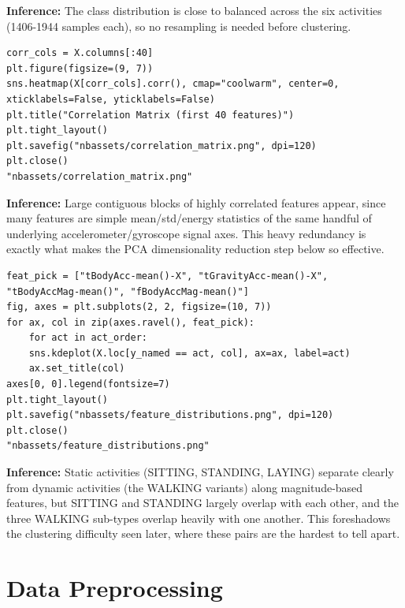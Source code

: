 \documentclass[12pt,a4paper]{article}
\begin{document}
\url{}

\textbf{Inference:} The class distribution is close to balanced across the six
activities (1406-1944 samples each), so no resampling is needed before
clustering.

\begin{verbatim}
corr_cols = X.columns[:40]
plt.figure(figsize=(9, 7))
sns.heatmap(X[corr_cols].corr(), cmap="coolwarm", center=0, xticklabels=False, yticklabels=False)
plt.title("Correlation Matrix (first 40 features)")
plt.tight_layout()
plt.savefig("nbassets/correlation_matrix.png", dpi=120)
plt.close()
"nbassets/correlation_matrix.png"
\end{verbatim}

\url{}

\textbf{Inference:} Large contiguous blocks of highly correlated features appear,
since many features are simple mean/std/energy statistics of the same
handful of underlying accelerometer/gyroscope signal axes. This heavy
redundancy is exactly what makes the PCA dimensionality reduction step
below so effective.

\begin{verbatim}
feat_pick = ["tBodyAcc-mean()-X", "tGravityAcc-mean()-X", "tBodyAccMag-mean()", "fBodyAccMag-mean()"]
fig, axes = plt.subplots(2, 2, figsize=(10, 7))
for ax, col in zip(axes.ravel(), feat_pick):
    for act in act_order:
	sns.kdeplot(X.loc[y_named == act, col], ax=ax, label=act)
    ax.set_title(col)
axes[0, 0].legend(fontsize=7)
plt.tight_layout()
plt.savefig("nbassets/feature_distributions.png", dpi=120)
plt.close()
"nbassets/feature_distributions.png"
\end{verbatim}

\url{}

\textbf{Inference:} Static activities (SITTING, STANDING, LAYING) separate clearly
from dynamic activities (the WALKING variants) along magnitude-based
features, but SITTING and STANDING largely overlap with each other, and the
three WALKING sub-types overlap heavily with one another. This foreshadows
the clustering difficulty seen later, where these pairs are the hardest to
tell apart.

\section{Data Preprocessing}
\label{sec:org6fe5967}
\end{document}
